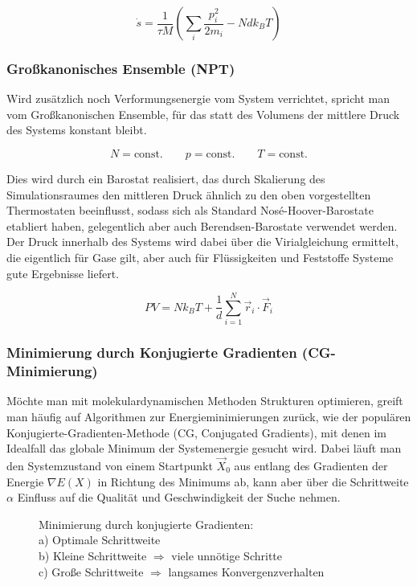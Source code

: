 \begin{equation}
  \dot s = \frac{1}{\tau M} \left(\sum_i{\frac{p_i^2}{2m_i}} - N d k_B T\right)
\end{equation}

\subsubsection{Großkanonisches Ensemble (NPT)}

Wird zusätzlich noch Verformungsenergie vom System verrichtet, spricht man vom Großkanonischen Ensemble, für das statt des Volumens der mittlere Druck des Systems konstant bleibt.

\begin{equation}
  N = \text{const.}
  \qquad
  p = \text{const.}
  \qquad
  T = \text{const.}
\end{equation}

Dies wird durch ein Barostat realisiert, das durch Skalierung des Simulationsraumes den mittleren Druck ähnlich zu den oben vorgestellten Thermostaten beeinflusst, sodass sich als Standard Nosé-Hoover-Barostate etabliert haben, gelegentlich aber auch Berendsen-Barostate verwendet werden.
Der Druck innerhalb des Systems wird dabei über die Virialgleichung ermittelt, die eigentlich für Gase gilt, aber auch für Flüssigkeiten und Feststoffe Systeme gute Ergebnisse liefert.

\begin{equation}
  PV = N k_B T + \frac{1}{d} \sum_{i=1}^N{\vec{r}_i \cdot \vec{F}_i}
\end{equation}

\subsubsection{Minimierung durch Konjugierte Gradienten (CG-Minimierung)}

Möchte man mit molekulardynamischen Methoden Strukturen optimieren, greift man häufig auf Algorithmen zur Energieminimierungen zurück, wie der populären Konjugierte-Gradienten-Methode (CG, Conjugated Gradients), mit denen im Idealfall das globale Minimum der Systemenergie gesucht wird.
Dabei läuft man den Systemzustand von einem Startpunkt $\vec X_0$ aus entlang des Gradienten der Energie $\nabla E(X)$ in Richtung des Minimums ab, kann aber über die Schrittweite $\alpha$ Einfluss auf die Qualität und Geschwindigkeit der Suche nehmen.

\begin{figure}
  \centering
  \def\svgwidth{0.5\textwidth}
  
  \caption[Minimierung durch Konjugierte Gradienten]{
    Minimierung durch konjugierte Gradienten:\\
    a) Optimale Schrittweite\\
    b) Kleine Schrittweite $\Rightarrow$ viele unnötige Schritte\\
    c) Große Schrittweite $\Rightarrow$ langsames Konvergenzverhalten
  }
  \label{fig:cg-gradient}
\end{figure}

